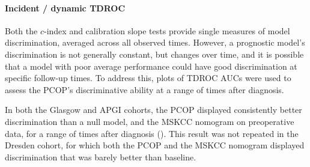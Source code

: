 \documentclass[dissertation.tex]{subfiles}
\begin{document}
\paragraph{Incident / dynamic \acrshort{TDROC}}
Both the $c$-index and calibration slope tests provide single measures of model discrimination, averaged across all observed times.  However, a prognostic model's discrimination is not generally constant, but changes over time, and it is possible that a model with poor average performance could have good discrimination at specific follow-up times.  To address this, plots of \gls{TDROC} \glspl{AUC} were used to assess the \gls{PCOP}'s discriminative ability at a range of times after diagnosis.

In both the Glasgow and \gls{APGI} cohorts, the \gls{PCOP} displayed consistently better discrimination than a null model, and the \gls{MSKCC} nomogram on preoperative data, for a range of times after diagnosis ().  This result was not repeated in the Dresden cohort, for which both the \gls{PCOP} and the \gls{MSKCC} nomogram displayed discrimination that was barely better than baseline.
\end{document}
